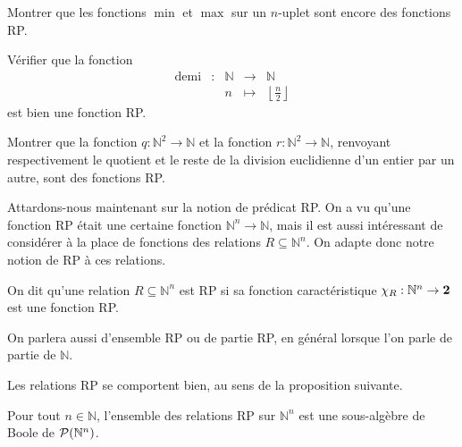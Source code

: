 \begin{exercise}
  Montrer que les fonctions $\min$ et $\max$ sur un $n$-uplet sont encore des
  fonctions RP.
\end{exercise}

\begin{exercise}
  Vérifier que la fonction
  \[\begin{array}{ccccc}
  \mathrm{demi} & : & \mathbb N &\longrightarrow & \mathbb N\\
  & & n &\longmapsto & \displaystyle\left\lfloor \frac{n}{2}\right\rfloor
  \end{array}\]
  est bien une fonction RP.
\end{exercise}

\begin{exercise}
  Montrer que la fonction $q : \mathbb N^2 \to \mathbb N$ et la fonction
  $r : \mathbb N^2 \to \mathbb N$, renvoyant respectivement le quotient et le
  reste de la division euclidienne d'un entier par un autre, sont des fonctions
  RP.
\end{exercise}

Attardons-nous maintenant sur la notion de prédicat RP. On a vu qu'une fonction
RP était une certaine fonction $\mathbb N^n \to \mathbb N$, mais il est aussi
intéressant de considérer à la place de fonctions des relations
$R\subseteq \mathbb N^n$. On adapte donc notre notion de RP à ces relations.

\begin{definition}[Relation RP]
  On dit qu'une relation $R \subseteq \mathbb N^n$ est RP si sa fonction
  caractéristique $\chi_R : \mathbb N^n \to \boldsymbol{2}$ est une fonction RP.
\end{definition}

\begin{remark}
  On parlera aussi d'ensemble RP ou de partie RP, en général lorsque l'on parle
  de partie de $\mathbb N$.
\end{remark}

Les relations RP se comportent bien, au sens de la proposition suivante.

\begin{proposition}
  Pour tout $n \in \mathbb N$, l'ensemble des relations RP sur $\mathbb N^n$
  est une sous-algèbre de Boole de $\mathcal{P}(\mathbb N^n)$.
\end{proposition}

